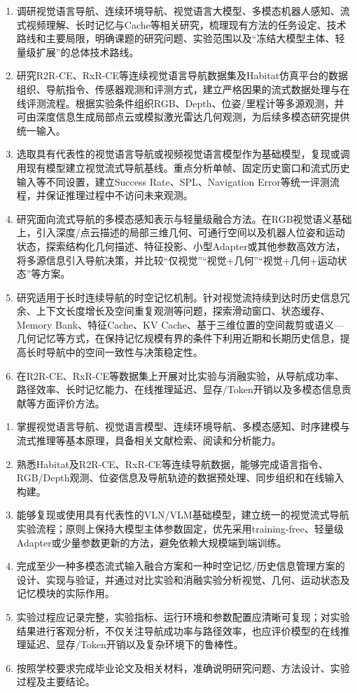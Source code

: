 \begin{enumerate}
  \item 调研视觉语言导航、连续环境导航、视觉语言大模型、多模态机器人感知、流式视频理解、长时记忆与Cache等相关研究，梳理现有方法的任务设定、技术路线和主要局限，明确课题的研究问题、实验范围以及“冻结大模型主体、轻量级扩展”的总体技术路线。
  \item 研究R2R-CE、RxR-CE等连续视觉语言导航数据集及Habitat仿真平台的数据组织、导航指令、传感器观测和评测方式，建立严格因果的流式数据处理与在线评测流程。根据实验条件组织RGB、Depth、位姿/里程计等多源观测，并可由深度信息生成局部点云或模拟激光雷达几何观测，为后续多模态研究提供统一输入。
  \item 选取具有代表性的视觉语言导航或视频视觉语言模型作为基础模型，复现或调用现有模型建立视觉流式导航基线。重点分析单帧、固定历史窗口和流式历史输入等不同设置，建立Success Rate、SPL、Navigation Error等统一评测流程，并保证推理过程中不访问未来观测。
  \item 研究面向流式导航的多模态感知表示与轻量级融合方法。在RGB视觉语义基础上，引入深度/点云描述的局部三维几何、可通行空间以及机器人位姿和运动状态，探索结构化几何描述、特征投影、小型Adapter或其他参数高效方法，将多源信息引入导航决策，并比较“仅视觉”“视觉+几何”“视觉+几何+运动状态”等方案。
  \item 研究适用于长时连续导航的时空记忆机制。针对视觉流持续到达时历史信息冗余、上下文长度增长及空间重复观测等问题，探索滑动窗口、状态缓存、Memory Bank、特征Cache、KV Cache、基于三维位置的空间裁剪或语义—几何记忆等方式，在保持记忆规模有界的条件下利用近期和长期历史信息，提高长时导航中的空间一致性与决策稳定性。
  \item 在R2R-CE、RxR-CE等数据集上开展对比实验与消融实验，从导航成功率、路径效率、长时记忆能力、在线推理延迟、显存/Token开销以及多模态信息贡献等方面评价方法。
\end{enumerate}



\begin{enumerate}
  \item 掌握视觉语言导航、视觉语言模型、连续环境导航、多模态感知、时序建模与流式推理等基本原理，具备相关文献检索、阅读和分析能力。
  \item 熟悉Habitat及R2R-CE、RxR-CE等连续导航数据，能够完成语言指令、RGB/Depth观测、位姿信息及导航轨迹的数据预处理、同步组织和在线输入构建。
  \item 能够复现或使用具有代表性的VLN/VLM基础模型，建立统一的视觉流式导航实验流程；原则上保持大模型主体参数固定，优先采用training-free、轻量级Adapter或少量参数更新的方法，避免依赖大规模端到端训练。
  \item 完成至少一种多模态流式输入融合方案和一种时空记忆/历史信息管理方案的设计、实现与验证，并通过对比实验和消融实验分析视觉、几何、运动状态及记忆模块的实际作用。
  \item 实验过程应记录完整，实验指标、运行环境和参数配置应清晰可复现；对实验结果进行客观分析，不仅关注导航成功率与路径效率，也应评价模型的在线推理延迟、显存/Token开销以及复杂环境下的鲁棒性。
  \item 按照学校要求完成毕业论文及相关材料，准确说明研究问题、方法设计、实验过程及主要结论。
\end{enumerate}

